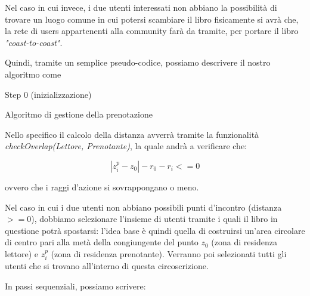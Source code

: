 \begin{itemize}
\begin{itemize}
		Nel caso in cui invece, i due utenti interessati non abbiano la possibilità di trovare un luogo comune in cui potersi scambiare il libro fisicamente si avrà che, la rete di users appartenenti alla community farà da tramite, per portare il libro \textit{"coast-to-coast"}.
		
		Quindi, tramite un semplice pseudo-codice, possiamo descrivere il nostro algoritmo come
	
		\begin{algorithm}[H]
			\SetAlgoLined
			Step 0 (inizializzazione)\;
			\caption{Algoritmo di gestione della prenotazione}
		\end{algorithm}
		
		
		Nello specifico il calcolo della distanza avverrà tramite la funzionalità \textit{checkOverlap(Lettore, Prenotante)}, la quale andrà a verificare che:
		
		{\LARGE \begin{equation}
			|z^{p}_{i}-z_{0}|-r_{0}-r_{i}<=0
		\end{equation}}
		
		ovvero che i raggi d'azione si sovrappongano o meno.
		
		Nel caso in cui i due utenti non abbiano possibili punti d'incontro (distanza $>= 0 $), dobbiamo selezionare l'insieme di utenti tramite i quali il libro in questione potrà spostarsi: l'idea base è quindi quella di costruirsi un'area circolare di centro pari alla metà della congiungente del punto $ z_{0} $ (zona di residenza lettore) e $ z^{p}_{i} $ (zona di residenza prenotante).
		Verranno poi selezionati tutti gli utenti che si trovano all'interno di questa circoscrizione.
		
		In passi sequenziali, possiamo scrivere:
		
		\begin{algorithm}[H]
			\SetAlgoLined
			

\end{algorithm}
\end{itemize}
\end{itemize}
